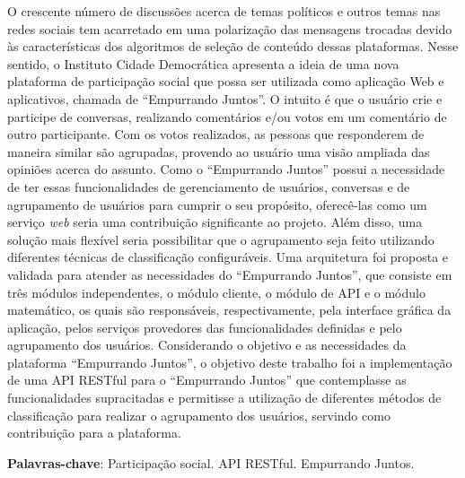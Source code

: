\begin{resumo}
O crescente número de discussões acerca de temas políticos e outros temas nas redes sociais tem acarretado em uma polarização 
das mensagens trocadas devido às características dos algoritmos de seleção de conteúdo dessas plataformas. 
Nesse sentido, o Instituto Cidade Democrática apresenta a ideia de uma nova plataforma de participação social
que possa ser utilizada como aplicação Web e aplicativos, chamada de ``Empurrando Juntos''. 
O intuito é que o usuário crie e participe de conversas, realizando comentários e/ou votos em um comentário de outro participante. 
Com os votos realizados, as pessoas que responderem de maneira similar são agrupadas, 
provendo ao usuário uma visão ampliada das opiniões acerca do assunto. 
% 
Como o ``Empurrando Juntos'' possui a necessidade de ter essas funcionalidades de
gerenciamento de usuários, conversas e de agrupamento de usuários para cumprir o seu propósito,
oferecê-las como um serviço \textit{web} seria uma contribuição significante ao projeto.
Além disso, uma solução mais flexível seria possibilitar que  o agrupamento seja feito
utilizando diferentes técnicas de classificação configuráveis.
% 
Uma arquitetura foi proposta e validada para atender as necessidades do ``Empurrando Juntos'',
que consiste em três módulos independentes, o módulo cliente, o módulo de API e o módulo matemático,
os quais são responsáveis, respectivamente, pela interface gráfica da aplicação,
pelos serviços provedores das funcionalidades definidas e pelo agrupamento dos usuários.
% 
Considerando o objetivo e as necessidades da plataforma ``Empurrando Juntos'', 
o objetivo deste trabalho foi a implementação de uma API RESTful para o ``Empurrando Juntos''
que contemplasse as funcionalidades supracitadas e permitisse a utilização de diferentes
métodos de classificação para realizar o agrupamento dos usuários, servindo como contribuição para a plataforma.
\vspace{\onelineskip}
  
  
\noindent
\textbf{Palavras-chave}: Participação social. API RESTful. Empurrando Juntos.
\end{resumo}
